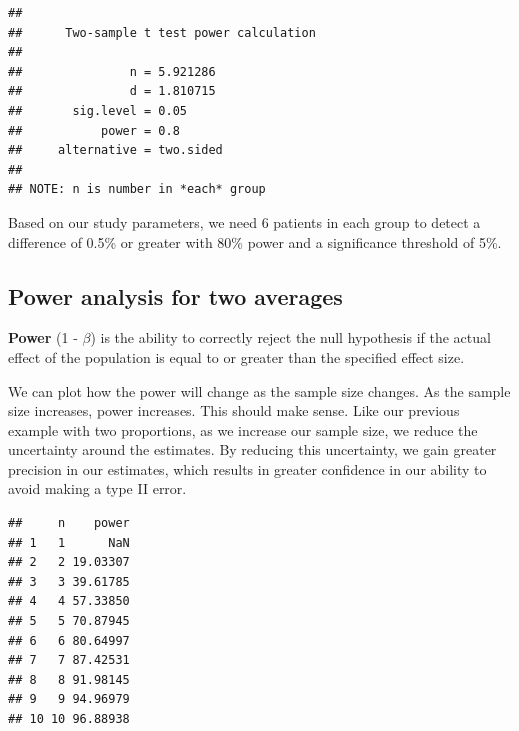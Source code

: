 \documentclass[
]{book}
\newenvironment{Shaded}{\begin{snugshade}}{\end{snugshade}}
\newcommand{\AttributeTok}[1]{\textcolor[rgb]{0.13,0.29,0.53}{#1}}
\newcommand{\DecValTok}[1]{\textcolor[rgb]{0.00,0.00,0.81}{#1}}
\newcommand{\DocumentationTok}[1]{\textcolor[rgb]{0.56,0.35,0.01}{\textbf{\textit{#1}}}}
\newcommand{\FloatTok}[1]{\textcolor[rgb]{0.00,0.00,0.81}{#1}}
\newcommand{\FunctionTok}[1]{\textcolor[rgb]{0.13,0.29,0.53}{\textbf{#1}}}
\newcommand{\NormalTok}[1]{#1}
\newcommand{\OtherTok}[1]{\textcolor[rgb]{0.56,0.35,0.01}{#1}}
\newcommand{\SpecialCharTok}[1]{\textcolor[rgb]{0.81,0.36,0.00}{\textbf{#1}}}
\begin{document}
\begin{verbatim}
## 
##      Two-sample t test power calculation 
## 
##               n = 5.921286
##               d = 1.810715
##       sig.level = 0.05
##           power = 0.8
##     alternative = two.sided
## 
## NOTE: n is number in *each* group
\end{verbatim}

Based on our study parameters, we need 6 patients in each group to detect a difference of 0.5\% or greater with 80\% power and a significance threshold of 5\%.

\hypertarget{power-analysis-for-two-averages}{%
\subsection{Power analysis for two averages}\label{power-analysis-for-two-averages}}

\textbf{Power} (1 - \(\beta\)) is the ability to correctly reject the null hypothesis if the actual effect of the population is equal to or greater than the specified effect size.

We can plot how the power will change as the sample size changes. As the sample size increases, power increases. This should make sense. Like our previous example with two proportions, as we increase our sample size, we reduce the uncertainty around the estimates. By reducing this uncertainty, we gain greater precision in our estimates, which results in greater confidence in our ability to avoid making a type II error.

\begin{Shaded}
\end{Shaded}

\begin{verbatim}
##     n    power
## 1   1      NaN
## 2   2 19.03307
## 3   3 39.61785
## 4   4 57.33850
## 5   5 70.87945
## 6   6 80.64997
## 7   7 87.42531
## 8   8 91.98145
## 9   9 94.96979
## 10 10 96.88938
\end{verbatim}
\end{document}

